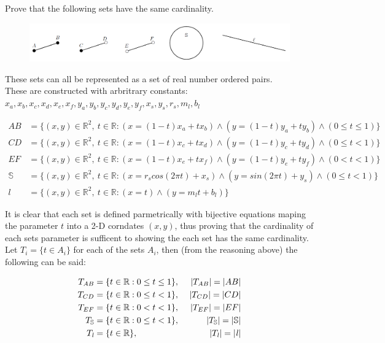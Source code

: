 \documentclass[]{article}
\newcommand{\R}{\mathbb{R}}
\begin{document}
\newpage
\section{}
Prove that the following sets have the same cardinality.
\begin{figure}[h]
	\centering
	\includegraphics[width=\textwidth]{fig/pblm6.png}
\end{figure}

These sets can all be represented as a set of real number ordered pairs.\\
These are constructed with arbritrary constants: 
$x_a,x_b,x_c,x_d,x_e,x_f,y_a,y_b,y_c,y_d,y_e,y_f,x_s,y_s,r_s,m_l,b_l$

\begin{align*}
	AB &= \{(x,y) \in \R^2, \ t \in \R : 
	(x = (1-t) x_a + t x_b) \land (y = (1-t) y_a + t y_b)
	\land (0 \leq t \leq 1)\}\\
	CD &= \{(x,y) \in \R^2, \ t \in \R : 
	(x = (1-t) x_c + t x_d) \land (y = (1-t) y_c + t y_d)
	\land (0 \leq t < 1)\}\\
	EF &= \{(x,y) \in \R^2, \ t \in \R : 
	(x = (1-t) x_e + t x_f) \land (y = (1-t) y_e + t y_f)
	\land (0 < t < 1)\}\\
	\mathbb{S} &= \{(x,y) \in \R^2, \ t \in \R : 
	(x = r_s cos(2 \pi t) + x_s) \land (y = sin(2 \pi t) + y_s)
	\land (0 \leq t < 1)\}\\
	\mathit{l} &= \{(x,y) \in \R^2, \ t \in \R: (x = t) \land (y = m_l t + b_l)\}
\end{align*}

It is clear that each set is defined parmetrically with bijective equations maping 
the parameter $t$ into a 2-D corndates $(x,y)$, thus proving that the cardinality 
of each sets parameter is sufficent to showing the each set has the same cardinality.\\

Let $T_i = \{t \in A_i\}$ for each of the sets $A_i$, then (from the reasoning above) 
the following can be said:

\begin{align*}
	T_{AB} &= \{t \in \R : 0 \leq t \leq 1\}, \ &\abs{T_{AB}} = \abs{AB}\\
	T_{CD} &= \{t \in \R : 0 \leq t < 1\}, \ &\abs{T_{CD}} = \abs{CD}\\
	T_{EF} &= \{t \in \R : 0 < t < 1\}, \ &\abs{T_{EF}} = \abs{EF}\\
	T_{\mathbb{S}} &= \{t \in \R : 0 \leq t < 1\}, \ &\abs{T_{\mathbb{S}}} = \abs{\mathbb{S}}\\
	T_{\mathit{l}} &= \{t \in \R\}, \ &\abs{T_{\mathit{l}}} = \abs{\mathit{l}}\\
\end{align*}
\end{document}
